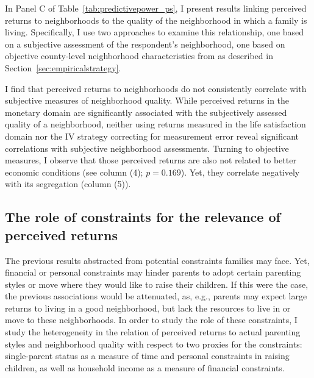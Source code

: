 \documentclass[12pt, a4paper, english]{article}
\begin{document}
In Panel C of Table~\ref{tab:predictivepower_ps}, I present results linking perceived returns to neighborhoods to the quality of the neighborhood in which a family is living. Specifically, I use two approaches to examine this relationship, one based on a subjective assessment of the respondent's neighborhood, one based on objective county-level neighborhood characteristics from \citet{ChettyHendren2018Exposure,ChettyHendren2018County} as described in Section~\ref{sec:empiricalstrategy}. 

I find that perceived returns to neighborhoods do not consistently correlate with subjective measures of neighborhood quality. While perceived returns in the monetary domain are significantly associated with the subjectively assessed quality of a neighborhood, neither using returns measured in the life satisfaction domain nor the IV strategy correcting for measurement error reveal significant correlations with subjective neighborhood assessments. Turning to objective measures, I observe that those perceived returns are also not related to better economic conditions (see column (4); $p=0.169$). Yet, they correlate negatively with its segregation (column (5)).

\subsection{The role of constraints for the relevance of perceived returns} 
The previous results abstracted from potential constraints families may face. Yet, financial or personal constraints may hinder parents to adopt certain parenting styles or move where they would like to raise their children. If this were the case, the previous associations would be attenuated, as, e.g., parents may expect large returns to living in a good neighborhood, but lack the resources to live in or move to these neighborhoods. In order to study the role of these constraints, I study the heterogeneity in the relation of perceived returns to actual parenting styles and neighborhood quality with respect to two proxies for the constraints: single-parent status as a measure of time and personal constraints in raising children, as well as household income as a measure of financial constraints.
\end{document}

